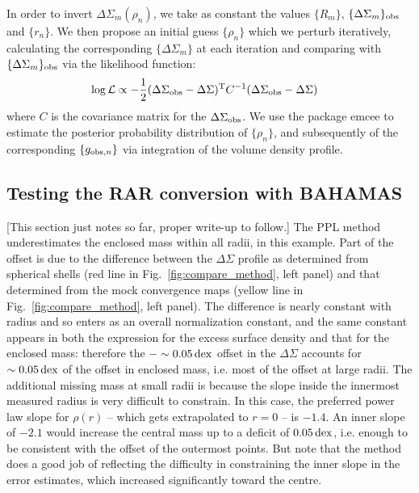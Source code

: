 \documentclass[usenatbib]{mnras}
\begin{document}
In order to invert $\Delta\Sigma_m(\rho_n)$, we take as constant the values $\{R_m\}$, $\{\Delta\Sigma_m\}_{\rm obs}$ and $\{r_n\}$. We then propose an initial guess $\{\rho_n\}$ which we perturb iteratively, calculating the corresponding $\{\Delta\Sigma_m\}$ at each iteration and comparing with $\{\Delta\Sigma_m\}_{\rm obs}$ via the likelihood function:
\begin{align}
\log\mathcal{L} &\propto -\frac{1}{2}(\Delta\Sigma_{\rm obs}-\Delta\Sigma)^{\rm T}C^{-1}(\Delta\Sigma_{\rm obs}-\Delta\Sigma)
\end{align}
where $C$ is the covariance matrix for the $\Delta\Sigma_{\rm obs}$. We use the package {\sc emcee} \citep{foreman-mackey13} to estimate the posterior probability distribution of $\{\rho_n\}$, and subsequently of the corresponding $\{g_{{\rm obs},n}\}$ via integration of the volume density profile.


\subsection{Testing the RAR conversion with BAHAMAS}
\label{sec:conversion_test}

[This section just notes so far, proper write-up to follow.] The PPL method underestimates the enclosed mass within all radii, in this example. Part of the offset is due to the difference between the $\Delta\Sigma$ profile as determined from spherical shells (red line in Fig.~\ref{fig:compare_method}, left panel) and that determined from the mock convergence maps (yellow line in Fig.~\ref{fig:compare_method}, left panel). The difference is nearly constant with radius and so enters as an overall normalization constant, and the same constant appears in both the expression for the excess surface density and that for the enclosed mass: therefore the $-\sim0.05\,{\rm dex}$ offset in the $\Delta\Sigma$ accounts for $\sim0.05\,{\rm dex}$ of the offset in enclosed mass, i.e. most of the offset at large radii. The additional missing mass at small radii is because the slope inside the innermost measured radius is very difficult to constrain. In this case, the preferred power law slope for $\rho(r)$ -- which gets extrapolated to $r=0$ -- is $-1.4$. An inner slope of $-2.1$ would increase the central mass up to a deficit of $0.05\,{\rm dex}$, i.e. enough to be consistent with the offset of the outermost points. But note that the method does a good job of reflecting the difficulty in constraining the inner slope in the error estimates, which increased significantly toward the centre.
\end{document}
